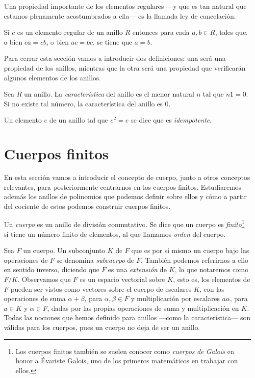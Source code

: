 Una propiedad importante de los elementos regulares —y que es tan natural que estamos plenamente acostumbrados a ella— es la llamada ley de cancelación.
\begin{proposition}
  Si \(c\) es un elemento regular de un anillo \(R\) entonces para cada \(a, b \in R\), tales que, o bien \(ca = cb\), o bien \(ac = bc\), se tiene que \(a = b\).
\end{proposition}

Para cerrar esta sección vamos a introducir dos definiciones: una será una propiedad de los anillos, mientras que la otra será una propiedad que verificarán algunos elementos de los anillos.

\begin{definition}
  Sea \(R\) un anillo. La \textit{característica} del anillo es el menor natural \(n\) tal que \(n1 = 0\).
  Si no existe tal número, la característica del anillo es \(0\).  
\end{definition}

\begin{definition}
  Un elemento \(e\) de un anillo tal que \(e^2 = e\) se dice que es \textit{idempotente}.
\end{definition}

\section{Cuerpos finitos}

En esta sección vamos a introducir el concepto de cuerpo, junto a otros conceptos relevantes, para posteriormente centrarnos en los cuerpos finitos.
Estudiaremos además los anillos de polinomios que podemos definir sobre ellos y cómo a partir del cociente de estos podemos construir cuerpos finitos.

\begin{definition}
  Un \textit{cuerpo} es un anillo de división conmutativo.
  Se dice que un cuerpo es \textit{finito}\footnote{Los cuerpos finitos también se suelen conocer como \textit{cuerpos de Galois} en honor a Évariste Galois, uno de los primeros matemáticos en trabajar con ellos.} si tiene un número finito de elementos, al que llamamos \textit{orden} del cuerpo.
\end{definition}

Sea \(F\) un cuerpo. Un subconjunto \(K\) de \(F\) que es por sí mismo un cuerpo bajo las operaciones de \(F\) se denomina \textit{subcuerpo} de \(F\).
También podemos referirnos a ello en sentido inverso, diciendo que \(F\) es una \textit{extensión} de \(K\), lo que notaremos como \(F/K\).
Observamos que \(F\) es un espacio vectorial sobre \(K\), esto es, los elementos de \(F\) pueden ser vistos como vectores sobre el cuerpo de escalares \(K\), con las operaciones de suma \(\alpha + \beta\), para \(\alpha, \beta \in F\) y multiplicación por escalares \(a\alpha\), para \(a \in K\) y \(\alpha \in F\), dadas por las propias operaciones de suma y multiplicación en \(K\).
Todas las nociones que hemos definido para anillos —como la característica— son válidas para los cuerpos, pues un cuerpo no deja de ser un anillo.

